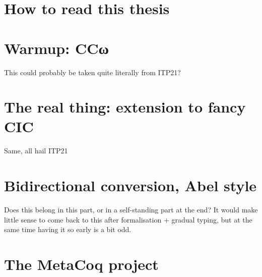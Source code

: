 \documentclass[
  french,english,
	fontsize=10pt, %
	twoside=true, %
	secnumdepth=1, %
]{kaobook/kaobook}
\begin{document}



\mainmatter %

\chapter*{How to read this thesis}










\chapter{Warmup: CCω}

This could probably be taken quite literally from ITP21?

\chapter{The real thing: extension to fancy CIC}

Same, all hail ITP21

\chapter{Bidirectional conversion, Abel style}

Does this belong in this part, or in a self-standing part at the end?
It would make little sense to come back to this after formalisation + gradual typing,
but at the same time having it so early is a bit odd.


\chapter{The MetaCoq project}
\end{document}
